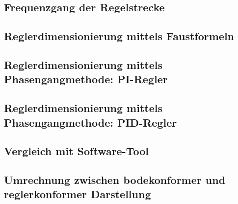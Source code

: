 \clearpage
\subsection{Frequenzgang der Regelstrecke}
\label{subs:frequenzgang}


\clearpage
\subsection{Reglerdimensionierung mittels Faustformeln}
\label{subs:faustformeln}


\clearpage
\subsection{Reglerdimensionierung mittels Phasengangmethode: PI-Regler}
\label{subs:phasengang:pi}


\clearpage
\subsection{Reglerdimensionierung mittels Phasengangmethode: PID-Regler}
\label{subs:phasengang:pid}


\clearpage
\subsection{Vergleich mit Software-Tool}
\label{subs:tool:results}


\clearpage
\subsection{Umrechnung zwischen bodekonformer und reglerkonformer Darstellung}
\label{subs:bode_regler}

